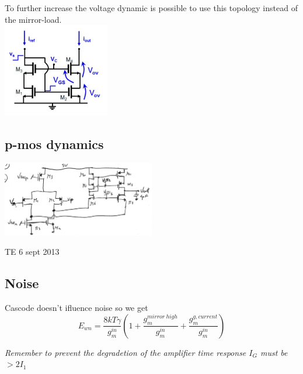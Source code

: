To further increase the voltage dynamic is possible to use this topology instead of the mirror-load.\\

\centering
\includegraphics[width=0.35\textwidth]{mirrorload.png}\\
\raggedright

\subsection{p-mos dynamics}


\centering
\includegraphics[width=0.5\textwidth]{pfcas.png}\\
\raggedright


TE 6 sept 2013\\

\subsection{Noise}
Cascode doesn't ifluence noise so we get
\begin{equation}
E_{wn}=\frac{8kT\gamma}{g_m^{in}}\left(1+\frac{g_m^{mirror\ high}}{g_m^{in}}+\frac{g_m^{g,current}}{g_m^{in}}   \right)
\end{equation}








{\it Remember to prevent the degradetion of the amplifier time response $I_G$ must be $>2I_1$}










